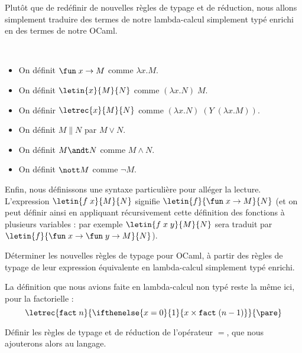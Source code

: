 Plutôt que de redéfinir de nouvelles règles de typage et de réduction, nous allons simplement traduire des termes de notre lambda-calcul simplement typé enrichi en des termes de notre OCaml.

\begin{defi}
    \ 
    \begin{itemize}[label=$\bullet$]
        \item On définit $\fun\;x\to M$ comme $\lambda x.M$.
        \item On définit $\letin{x}{M}{N}$ comme $(\lambda x. N)\;M$.
        \item On définir $\letrec{x}{M}{N}$ comme $(\lambda x. N)\;(Y\;(\lambda x. M))$.
        \item On définit $M\|N$ par $M\lor N$.
        \item On définit $M\andt N$ comme $M\land N$.
        \item On définit $\nott M$ comme $\lnot M$.
    \end{itemize}
\end{defi}

Enfin, nous définissons une syntaxe particulière pour alléger la lecture. L'expression $\letin{f\;x}{M}{N}$ signifie $\letin{f}{\fun\;x\to M}{N}$ (et on peut définir ainsi en appliquant récursivement cette définition des fonctions à plusieurs variables : par exemple $\letin{f\;x\;y}{M}{N}$ sera traduit par $\letin{f}{\fun\;x\to\fun\;y\to M}{N}$).

\begin{exo}
    Déterminer les nouvelles règles de typage pour OCaml, à partir des règles de typage de leur expression équivalente en lambda-calcul simplement typé enrichi.
\end{exo}

\begin{rmk}
    La définition que nous avions faite en lambda-calcul non typé reste la même ici, pour la factorielle :
    $$\letrec{\texttt{fact}\;n}{\ifthenelse{x=0}{1}{x\times \texttt{fact}\;(n-1)}}{\pare}$$
\end{rmk}

\begin{exo}
    Définir les règles de typage et de réduction de l'opérateur $=$, que nous ajouterons alors au langage.
\end{exo}

\newpage